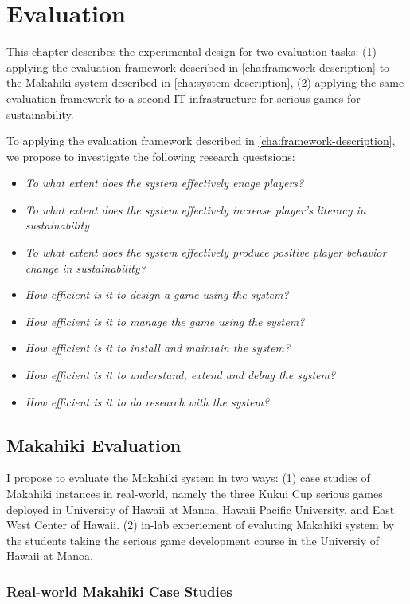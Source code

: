 \chapter{Evaluation}
\label{cha:ExperimentalDesign}
This chapter describes the experimental design for two evaluation tasks: (1) applying the evaluation framework described in \autoref{cha:framework-description} to the Makahiki system described in \autoref{cha:system-description}, (2) applying the same evaluation framework to a second IT infrastructure for serious games for sustainability.

To applying the evaluation framework described in \autoref{cha:framework-description}, we propose to investigate the following research questsions:

\begin {itemize}
    \item \emph{To what extent does the system effectively enage players?}
    \item \emph{To what extent does the system effectively increase player's literacy in sustainability}
    \item \emph{To what extent does the system effectively produce positive player behavior change in sustainability?}
    \item \emph{How efficient is it to design a game using the system?}
    \item \emph{How efficient is it to manage the game using the system?}
    \item \emph{How efficient is it to install and maintain the system?}
    \item \emph{How efficient is it to understand, extend and debug the system?}
    \item \emph{How efficient is it to do research with the system?}
\end {itemize}

\section{Makahiki Evaluation}
I propose to evaluate the Makahiki system in two ways: (1) case studies of Makahiki instances in real-world, namely the three Kukui Cup serious games deployed in University of Hawaii at Manoa, Hawaii Pacific University, and East West Center of Hawaii. (2) in-lab experiement of evaluting Makahiki system by the students taking the serious game development course in the Universiy of Hawaii at Manoa.

\subsection{Real-world Makahiki Case Studies}

